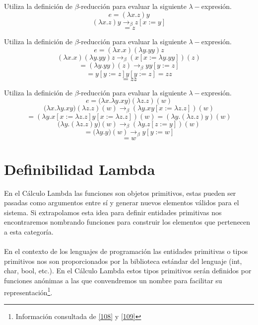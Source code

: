     \begin{exercise}
    Utiliza la definición de $\beta$-reducción para evaluar la siguiente $\lambda-$expresión.
    $$e= (\lambda x.z)y$$
    \[ (\lambda x.z)y \rightarrow_\beta  z [x := y]\]
    \[ = z \]
    \end{exercise}

    \begin{exercise}
        Utiliza la definición de $\beta$-reducción para evaluar la siguiente $\lambda-$expresión.
        $$e = (\lambda x.x)(\lambda y.yy) z$$
        \[ (\lambda x.x)(\lambda y.yy) z \rightarrow_\beta (x[x:=\lambda y.yy])(z)\]
        \[ = (\lambda y.yy)(z) \rightarrow_\beta yy[y:=z]\]
        \[ =  y[y:=z]y[y:=z] = zz\]
       \[= zz \]
    \end{exercise}

    \begin{exercise}
        Utiliza la definición de $\beta$-reducción para evaluar la siguiente $\lambda-$expresión.
        $$e= \big(\lambda x.\lambda y.xy\big)(\lambda z.z)(w)$$
        \[\big(\lambda x.\lambda y.xy\big)(\lambda z.z)(w) \rightarrow_\beta (\lambda y.xy[x := \lambda z.z])(w) \]
        \[ =  (\lambda y.x[x := \lambda z.z]y[x := \lambda z.z])(w) = (\lambda y.(\lambda z.z)y)(w) \]
        \[ \big(\lambda y.(\lambda z.z)y\big)(w) \rightarrow_\beta (\lambda y.z[z := y])(w) \]
        \[ = \big(\lambda y.y\big)(w) \rightarrow_\beta y[y := w] \]
        \[ = w \]
    \end{exercise}

    \section{Definibilidad Lambda}
    En el Cálculo Lambda las funciones son objetos primitivos, estas pueden ser pasadas como argumentos entre sí y generar nuevos elementos válidos para el sistema. Si extrapolamos esta idea para definir entidades primitivas nos encontraremos nombrando funciones para construir los elementos que pertenecen a esta categoría.\\\\
 En el contexto de los lenguajes de programación las entidades primitivas o tipos primitivos nos son proporcionados por la biblioteca estándar del lenguaje (\textsf{int}, \textsf{char}, \textsf{boo}l, etc.). En el Cálculo Lambda estos tipos primitivos serán definidos por funciones anónimas a las que convendremos un nombre para facilitar su representación\footnote{Información consultada de \hyperlink{108}{[108]} y  \hyperlink{109}{[109]}}.

